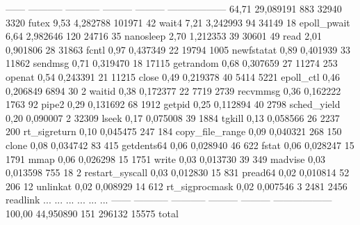 \begin{myverbatim}
------ ----------- ----------- --------- --------- ------------------
 64,71   29,089191         883     32940      3320 futex
  9,53    4,282788      101971        42           wait4
  7,21    3,242993          94     34149        18 epoll_pwait
  6,64    2,982646         120     24716        35 nanosleep
  2,70    1,212353          39     30601        49 read
  2,01    0,901806          28     31863           fcntl
  0,97    0,437349          22     19794      1005 newfstatat
  0,89    0,401939          33     11862           sendmsg
  0,71    0,319470          18     17115           getrandom
  0,68    0,307659          27     11274       253 openat
  0,54    0,243391          21     11215           close
  0,49    0,219378          40      5414      5221 epoll_ctl
  0,46    0,206849        6894        30         2 waitid
  0,38    0,172377          22      7719      2739 recvmmsg
  0,36    0,162222        1763        92           pipe2
  0,29    0,131692          68      1912           getpid
  0,25    0,112894          40      2798           sched_yield
  0,20    0,090007           2     32309           lseek
  0,17    0,075008          39      1884           tgkill
  0,13    0,058566          26      2237       200 rt_sigreturn
  0,10    0,045475         247       184           copy_file_range
  0,09    0,040321         268       150           clone
  0,08    0,034742          83       415           getdents64
  0,06    0,028940          46       622           fstat
  0,06    0,028247          15      1791           mmap
  0,06    0,026298          15      1751           write
  0,03    0,013730          39       349           madvise
  0,03    0,013598         755        18         2 restart_syscall
  0,03    0,012830          15       831           pread64
  0,02    0,010814          52       206        12 unlinkat
  0,02    0,008929          14       612           rt_sigprocmask
  0,02    0,007546           3      2481      2456 readlink
  ...         ...         ...       ...       ... ...   
------ ----------- ----------- --------- --------- ------------------
100,00   44,950890         151    296132     15575 total
\end{myverbatim}
